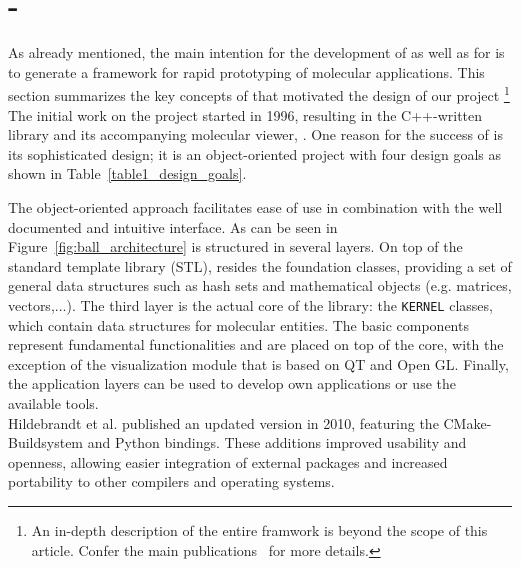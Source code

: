 \section{\ball -  \ballFull}
\label{sec:ball}
As already mentioned, the main intention for the development of \ball as well as for \biochem is to generate a framework for rapid prototyping of molecular applications. This section summarizes the key concepts of \ball that motivated the design of our project \footnote{An in-depth description of the entire \ball framwork is beyond the scope of this article. Confer the main publications~\cite{kohlbacher_ballrapid_2000, hildebrandt_ball_2010}  for more details.}\\
The initial work on the \ball project started in 1996, resulting in the C++-written library \ball and its accompanying molecular viewer, \textit{\ballview}. One reason for the success of \ball is its sophisticated design; it is an  object-oriented project with four design goals as shown in Table~\ref{table1_design_goals}.

\begin{table}

	\label{table1_design_goals}
\end{table}

The object-oriented approach facilitates ease of use in combination with the well documented and intuitive interface. As can be seen in Figure~\ref{fig:ball_architecture} \ball is structured in several layers. On top of the standard template library (STL), resides the foundation classes, providing a set of general data structures such as hash sets and mathematical objects (e.g. matrices, vectors,...). The third layer is the actual core of the library: the \texttt{KERNEL} classes, which contain data structures for molecular entities. The basic components represent fundamental functionalities and are placed on top of the core, with the exception of the visualization module that is based on QT and Open GL. Finally, the application layers can be used to develop own applications or use the available tools. \\
Hildebrandt et al. published an updated version in 2010, featuring the CMake-Buildsystem and Python bindings. These additions improved usability and openness, allowing easier integration of external packages and increased portability to other compilers and operating systems. \\

